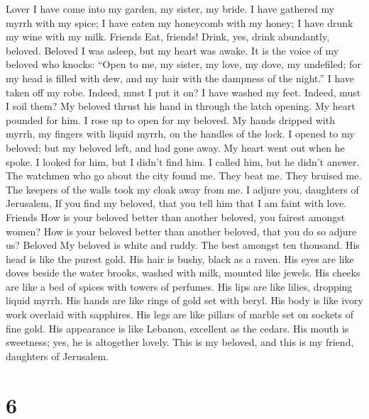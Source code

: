 Lover  I have come into my garden, my sister, my bride. I
have gathered my myrrh with my spice; I have eaten my honeycomb with my
honey; I have drunk my wine with my milk. Friends Eat, friends! Drink,
yes, drink abundantly, beloved. Beloved  I was asleep, but
my heart was awake. It is the voice of my beloved who knocks: ``Open to
me, my sister, my love, my dove, my undefiled; for my head is filled
with dew, and my hair with the dampness of the night.''  I
have taken off my robe. Indeed, must I put it on? I have washed my feet.
Indeed, must I soil them?  My beloved thrust his hand in
through the latch opening. My heart pounded for him.  I
rose up to open for my beloved. My hands dripped with myrrh, my fingers
with liquid myrrh, on the handles of the lock.  I opened
to my beloved; but my beloved left, and had gone away. My heart went out
when he spoke. I looked for him, but I didn't find him. I called him,
but he didn't answer.  The watchmen who go about the city
found me. They beat me. They bruised me. The keepers of the walls took
my cloak away from me.  I adjure you, daughters of
Jerusalem, If you find my beloved, that you tell him that I am faint
with love. Friends  How is your beloved better than
another beloved, you fairest amongst women? How is your beloved better
than another beloved, that you do so adjure us? Beloved 
My beloved is white and ruddy. The best amongst ten thousand.
 His head is like the purest gold. His hair is bushy,
black as a raven.  His eyes are like doves beside the
water brooks, washed with milk, mounted like jewels.  His
cheeks are like a bed of spices with towers of perfumes. His lips are
like lilies, dropping liquid myrrh.  His hands are like
rings of gold set with beryl. His body is like ivory work overlaid with
sapphires.  His legs are like pillars of marble set on
sockets of fine gold. His appearance is like Lebanon, excellent as the
cedars.  His mouth is sweetness; yes, he is altogether
lovely. This is my beloved, and this is my friend, daughters of
Jerusalem.

\hypertarget{section-5}{%
\section{6}\label{section-5}}

